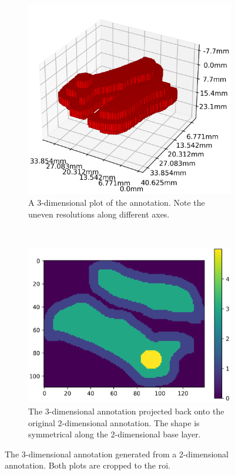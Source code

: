 \begin{figure}[H]
    \centering
    \begin{subfigure}[t]{0.4\textwidth}
        \includegraphics[width=\textwidth]{img/3d_mr1a.png}
        \caption{A 3-dimensional plot of the annotation. Note the uneven resolutions along different axes.}\label{fig:3d-3d}
    \end{subfigure}
    ~
    \begin{subfigure}[t]{0.4\textwidth}
        \includegraphics[width=\textwidth]{img/heatmap_mr1a.png}
        \caption{The 3-dimensional annotation projected back onto the original 2-dimensional annotation. The shape is symmetrical along the 2-dimensional base layer.}\label{fig:3d-2d}
    \end{subfigure}
    \caption{The 3-dimensional annotation generated from a 2-dimensional annotation. Both plots are cropped to the \ac{roi}.}\label{fig:3d-annotation}
\end{figure}


